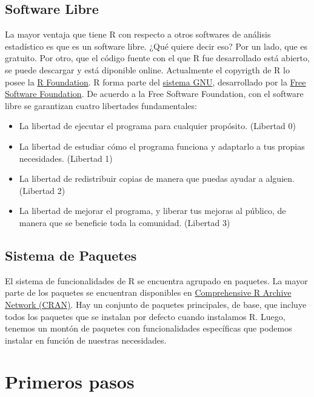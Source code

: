 \documentclass[spanish,]{book}
\providecommand{\tightlist}{%
  \setlength{\itemsep}{0pt}\setlength{\parskip}{0pt}}
\begin{document}
\section{Software Libre}\label{software-libre}

La mayor ventaja que tiene R con respecto a otros softwares de análisis
estadístico es que es un software libre. ¿Qué quiere decir eso? Por un
lado, que es gratuito. Por otro, que el código fuente con el que R fue
desarrollado está abierto, se puede descargar y está diponible online.
Actualmente el copyrigth de R lo posee la
\href{https://www.r-project.org/foundation/}{R Foundation}. R forma
parte del \href{https://es.wikipedia.org/wiki/GNU}{sistema GNU},
desarrollado por la
\href{https://es.wikipedia.org/wiki/Free_Software_Foundation}{Free
Software Foundation}. De acuerdo a la Free Software Foundation, con el
software libre se garantizan cuatro libertades fundamentales:

\begin{itemize}
\tightlist
\item
  La libertad de ejecutar el programa para cualquier propósito.
  (Libertad 0)
\item
  La libertad de estudiar cómo el programa funciona y adaptarlo a tus
  propias necesidades. (Libertad 1)
\item
  La libertad de redistribuir copias de manera que puedas ayudar a
  alguien. (Libertad 2)
\item
  La libertad de mejorar el programa, y liberar tus mejoras al público,
  de manera que se beneficie toda la comunidad. (Libertad 3)
\end{itemize}

\section{Sistema de Paquetes}\label{sistema-de-paquetes}

El sistema de funcionalidades de R se encuentra agrupado en paquetes. La
mayor parte de los paquetes se encuentran disponibles en
\href{https://cran.r-project.org/}{Comprehensive R Archive Network
(CRAN)}. Hay un conjunto de paquetes principales, de base, que incluye
todos los paquetes que se instalan por defecto cuando instalamos R.
Luego, tenemos un montón de paquetes con funcionalidades específicas que
podemos instalar en función de nuestras necesidades.

\chapter{Primeros pasos}\label{primeros-pasos}
\end{document}
